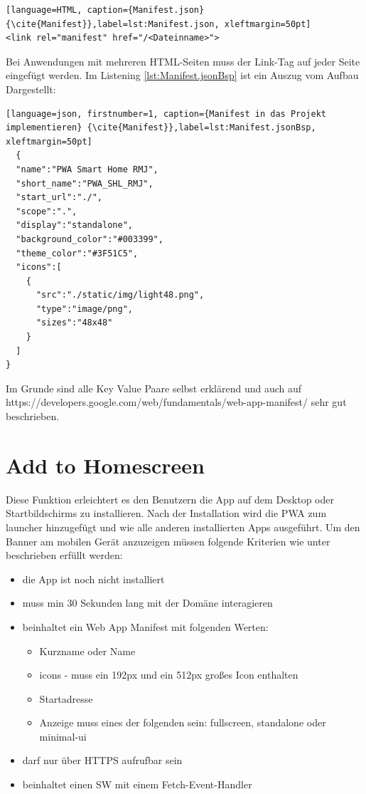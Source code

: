 \begin{lstlisting}[language=HTML, caption={Manifest.json} {\cite{Manifest}},label=lst:Manifest.json, xleftmargin=50pt]
<link rel="manifest" href="/<Dateinname>">
\end{lstlisting}

Bei Anwendungen mit mehreren \acs{HTML}-Seiten muss der Link-Tag auf jeder Seite eingefügt werden. 
Im Listening \ref{lst:Manifest.jsonBsp} ist ein Auszug vom Aufbau Dargestellt:
	\begin{lstlisting}[language=json, firstnumber=1, caption={Manifest in das Projekt implementieren} {\cite{Manifest}},label=lst:Manifest.jsonBsp, xleftmargin=50pt]
  {
  "name":"PWA Smart Home RMJ",
  "short_name":"PWA_SHL_RMJ",
  "start_url":"./",
  "scope":".",
  "display":"standalone",
  "background_color":"#003399",
  "theme_color":"#3F51C5",
  "icons":[
    {
      "src":"./static/img/light48.png",
      "type":"image/png",
      "sizes":"48x48"
    }
  ]
}

\end{lstlisting}

Im Grunde sind alle Key Value Paare selbst erklärend und auch auf https://developers.google.com/web/fundamentals/web-app-manifest/ sehr gut beschrieben. 

\section{Add to Homescreen}\label{sub:AddtoHomescreen}
Diese Funktion erleichtert es den Benutzern die App auf dem Desktop oder Startbildschirms zu installieren. Nach der Installation wird die PWA zum launcher hinzugefügt und wie alle anderen installierten Apps ausgeführt.
Um den Banner am mobilen Gerät anzuzeigen müssen folgende Kriterien wie unter \cite{AddToHomescreen} beschrieben erfüllt werden:


\begin{itemize}
    \item  die App ist noch nicht installiert
	\item  muss min 30 Sekunden lang mit der Domäne interagieren
	\item  beinhaltet ein Web App Manifest mit folgenden Werten:
		 \begin{itemize}
         \item Kurzname oder Name
         \item icons - muss ein 192px und ein 512px großes Icon enthalten
         \item Startadresse
         \item Anzeige muss eines der folgenden sein: fullscreen, standalone oder \\ minimal-ui
      	\end{itemize}
    \item 	darf nur über HTTPS aufrufbar sein
    \item beinhaltet einen \acl{SW} mit einem Fetch-Event-Handler
\end{itemize}

